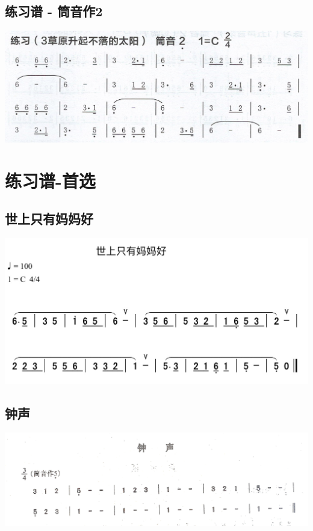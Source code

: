 \documentclass[cn,pad,chinesefont=nofont,twocol]{elegantbook}
\begin{document}
\section{练习谱 - 筒音作2}
	\includegraphics[width=\textwidth]{dongxiao/Scan 6.jpeg}

\chapter{练习谱-首选}
\section{世上只有妈妈好}
	\includegraphics[width=\textwidth]{dongxiao/IMG_0854-世上只有妈妈好.png}
\section{钟声}
	\includegraphics[width=\textwidth]{dongxiao/20200711-钟声.jpg}
\end{document}
